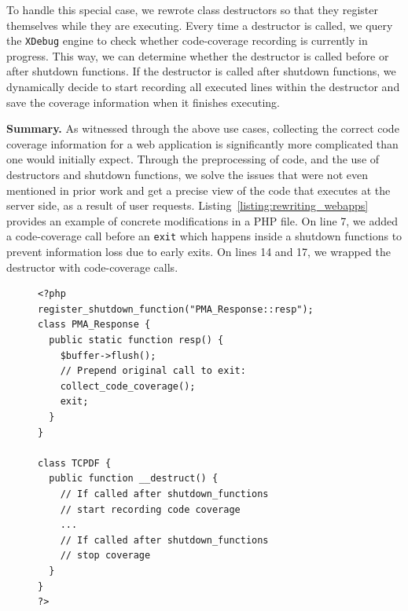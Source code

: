 To handle this special case, we rewrote class destructors so that they
register themselves while they are executing. Every time a destructor
is called, we query the \texttt{XDebug} engine to check whether code-coverage
recording is currently in progress. This way, we can determine whether the
destructor is called before or after shutdown functions. If the destructor
is called after shutdown functions, we dynamically decide to start recording
all executed lines within the destructor and save the coverage information
when it finishes executing.


\vspace{1ex}
\noindent\textbf{Summary.}
As witnessed through the above use cases, collecting the correct code coverage information
for a web application is significantly more complicated than one would
initially expect. Through the preprocessing of code, and the use of destructors
and shutdown functions, we solve the issues that were not even mentioned
in prior work and get a precise view of the code that executes at the server
side, as a result of user requests. Listing~\ref{listing:rewriting_webapps}
provides an example of concrete modifications in a PHP file. On line 7, we
added a code-coverage call before an \texttt{exit} which happens inside a shutdown functions to prevent information
loss due to early exits. On lines 14 and 17, we wrapped the destructor with
code-coverage calls.


\begin{figure}[t]
\begin{lstlisting}[frame=single, caption={Code rewritten by the debloating framework to ensure correct code coverage of corner cases.},captionpos=b, label={listing:rewriting_webapps}]
<?php
register_shutdown_function("PMA_Response::resp");
class PMA_Response {
  public static function resp() {
    $buffer->flush();
    // Prepend original call to exit:
    collect_code_coverage();
    exit;
  }
}

class TCPDF {
  public function __destruct() {
    // If called after shutdown_functions
    // start recording code coverage
    ...
    // If called after shutdown_functions
    // stop coverage
  }
}
?>
\end{lstlisting}
\vspace{-4ex}
\end{figure}

